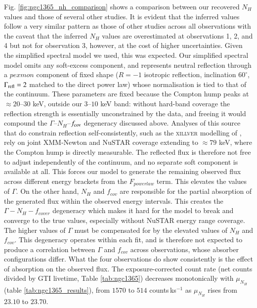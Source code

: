 \documentclass{aa}
\begin{document}
Fig. \ref{fig:ngc1365_nh_comparison} shows a comparison between our recovered $N_H$ values and those of several other studies. It is evident that the inferred values follow a very similar pattern as those of other studies across all observations with the caveat that the inferred $N_H$ values are overestimated at observations 1, 2, and 4 but not for observation 3, however, at the cost of higher uncertainties. Given the simplified spectral model we used, this was expected. Our simplified spectral model omits any soft-excess component, and represents neutral reflection through a $pexmon$ component \citep{Nandra2007} of fixed shape ($R = -1$ isotropic reflection, inclination $60^{\circ}$, $\Gamma_{\rm refl} = 2$ matched to the direct power law) whose normalisation is tied to that of the continuum. These parameters are fixed because the Compton hump peaks at $\approx 20$--$30$ keV, outside our $3$--$10$ keV band: without hard-band coverage the reflection strength is essentially unconstrained by the data, and freeing it would compound the $\Gamma$--$N_H$--$f_{\rm cov}$ degeneracy discussed above. Analyses of this source that do constrain reflection self-consistently, such as the \textsc{xillver} modelling of \citet{Rivers2015}, rely on joint XMM-Newton and NuSTAR coverage extending to $\approx 79$ keV, where the Compton hump is directly measurable. The reflected flux is therefore not free to adjust independently of the continuum, and no separate soft component is available at all. This forces our model to generate the remaining observed flux across different energy brackets from the $F_{powerlaw}$ term. This elevates the values of $\Gamma$. On the other hand, $N_H$ and $f_{cov}$ are responsible for the partial absorption of the generated flux within the observed energy intervals. This creates the $\Gamma-N_H-f_{cover}$ degeneracy which makes it hard for the model to break and converge to the true values, especially without NuSTAR energy range coverage. The higher values of $\Gamma$ must be compensated for by the elevated values of $N_H$
and $f_{cov}$. This degeneracy operates within each fit, and is therefore not expected
to produce a correlation between $\Gamma$ and $f_{cov}$ across observations, whose
absorber configurations differ. What the four observations do show consistently is the
effect of absorption on the observed flux. The exposure-corrected count rate (net counts
divided by GTI livetime, Table \ref{tab:ngc1365}) decreases monotonically with
$\mu_{N_H}$ (table \ref{tab:ngc1365_results}), from $1570$ to $514$ counts\,ks$^{-1}$ as
$\mu_{N_H}$ rises from $23.10$ to $23.70$. \\ 
\end{document}
